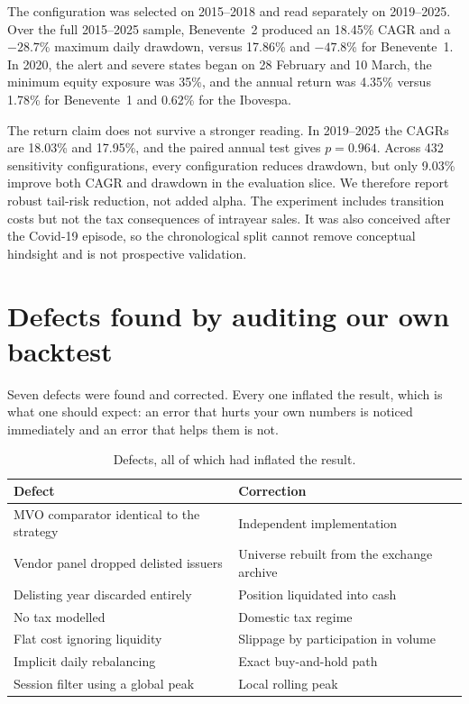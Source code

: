 \documentclass[10pt,conference]{IEEEtran}
\begin{document}
The configuration was selected on 2015--2018 and read separately on 2019--2025. Over the full 2015--2025 sample, Benevente~2 produced an 18.45\% CAGR and a $-28.7$\% maximum daily drawdown, versus 17.86\% and $-47.8$\% for Benevente~1. In 2020, the alert and severe states began on 28 February and 10 March, the minimum equity exposure was 35\%, and the annual return was 4.35\% versus 1.78\% for Benevente~1 and 0.62\% for the Ibovespa.

The return claim does not survive a stronger reading. In 2019--2025 the CAGRs are 18.03\% and 17.95\%, and the paired annual test gives $p=0.964$. Across 432 sensitivity configurations, every configuration reduces drawdown, but only 9.03\% improve both CAGR and drawdown in the evaluation slice. We therefore report robust tail-risk reduction, not added alpha. The experiment includes transition costs but not the tax consequences of intrayear sales. It was also conceived after the Covid-19 episode, so the chronological split cannot remove conceptual hindsight and is not prospective validation.

\section{Defects found by auditing our own backtest}

Seven defects were found and corrected. Every one inflated the result, which is what one should expect: an error that hurts your own numbers is noticed immediately and an error that helps them is not.

\begin{table}[t]
\caption{Defects, all of which had inflated the result.}
\centering
\small
\begin{tabular}{p{3.1cm}p{4.1cm}}
\toprule
Defect & Correction \\
\midrule
MVO comparator identical to the strategy & Independent implementation \\
Vendor panel dropped delisted issuers & Universe rebuilt from the exchange archive \\
Delisting year discarded entirely & Position liquidated into cash \\
No tax modelled & Domestic tax regime \\
Flat cost ignoring liquidity & Slippage by participation in volume \\
Implicit daily rebalancing & Exact buy-and-hold path \\
Session filter using a global peak & Local rolling peak \\
\bottomrule
\end{tabular}
\label{tab:defects}
\end{table}
\end{document}
